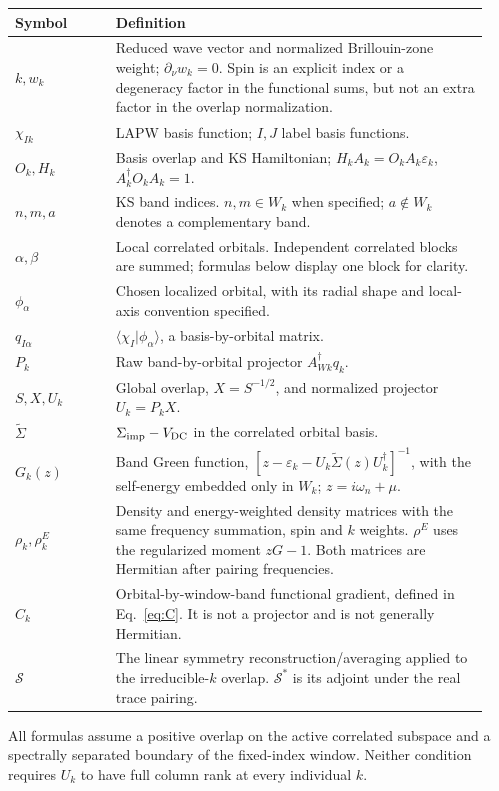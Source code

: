 \documentclass[11pt]{article}
\newcommand{\Sig}{\widetilde\Sigma}
\newcommand{\Sym}{\mathcal S}
\begin{document}
\begin{longtable}{p{0.20\linewidth}p{0.74\linewidth}}
\toprule Symbol & Definition\\\midrule
$k,w_k$ & Reduced wave vector and normalized Brillouin-zone weight;
$\partial_\nu w_k=0$. Spin is an explicit index or a degeneracy factor in
the functional sums, but not an extra factor in the overlap normalization.\\
$\chi_{Ik}$ & LAPW basis function; $I,J$ label basis functions.\\
$O_k,H_k$ & Basis overlap and KS Hamiltonian;
$H_k A_k=O_k A_k\varepsilon_k$, $A_k^\dagger O_k A_k=1$.\\
$n,m,a$ & KS band indices. $n,m\in W_k$ when specified; $a\notin W_k$
denotes a complementary band.\\
$\alpha,\beta$ & Local correlated orbitals. Independent correlated blocks
are summed; formulas below display one block for clarity.\\
$\phi_\alpha$ & Chosen localized orbital, with its radial shape and local-axis
convention specified.\\
$q_{I\alpha}$ & $\langle\chi_I|\phi_\alpha\rangle$, a basis-by-orbital matrix.\\
$P_k$ & Raw band-by-orbital projector $A_{Wk}^\dagger q_k$.\\
$S,X,U_k$ & Global overlap, $X=S^{-1/2}$, and normalized projector $U_k=P_kX$.\\
$\Sig$ & $\Sigma_{\rm imp}-V_{\rm DC}$ in the correlated orbital basis.\\
$G_k(z)$ & Band Green function, $[z-\varepsilon_k-U_k\Sig(z)U_k^\dagger]^{-1}$,
with the self-energy embedded only in $W_k$; $z=i\omega_n+\mu$.\\
$\rho_k,\rho^E_k$ & Density and energy-weighted density matrices with the same
frequency summation, spin and $k$ weights. $\rho^E$ uses the regularized
moment $zG-1$. Both matrices are Hermitian after pairing frequencies.\\
$C_k$ & Orbital-by-window-band functional gradient, defined in Eq.~\eqref{eq:C}.
It is not a projector and is not generally Hermitian.\\
$\Sym$ & The linear symmetry reconstruction/averaging applied to the
irreducible-$k$ overlap. $\Sym^*$ is its adjoint under the real trace pairing.\\
\bottomrule
\end{longtable}
All formulas assume a positive overlap on the active correlated subspace and
a spectrally separated boundary of the fixed-index window. Neither condition
requires $U_k$ to have full column rank at every individual $k$.
\end{document}
